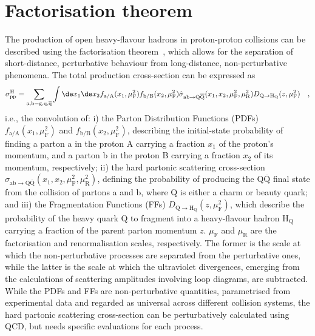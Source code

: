 \section{Factorisation theorem}
The production of open heavy-flavour hadrons in proton-proton collisions can be described using the factorisation theorem~\cite{Collins:1989gx}, which allows for the separation of short-distance, perturbative behaviour from long-distance, non-perturbative phenomena. The total production cross-section can be expressed as
\begin{equation}\label{eq:pp_xsec}
    \sigma_{\text{pp}}^\mathrm{H} = \sum_\mathrm{a,b = g, q, \overline{q}} \int \de x_1 \de x_2 f_\mathrm{a/A}(x_1,\mu_\mathrm{F}^2) f_\mathrm{b/B}(x_2,\mu_\mathrm{F}^2) \hat{\sigma}_\mathrm{ab \rightarrow Q\overline{Q}} (x_1,x_2,\mu_\mathrm{F}^2,\mu_\mathrm{R}^2) D_\mathrm{Q\rightarrow H_Q}(z,\mu_\mathrm{F}^2) \quad ,
\end{equation}
i.e., the convolution of: i) the Parton Distribution Functions (PDFs) $f_\mathrm{a/A}(x_1,\mu_\mathrm{F}^2)$ and $f_\mathrm{b/B}(x_2,\mu_\mathrm{F}^2)$, describing the initial-state probability of finding a parton a in the proton A carrying a fraction $x_1$ of the proton's momentum, and a parton b in the proton B carrying a fraction $x_2$ of its momentum, respectively; ii) the hard partonic scattering cross-section $\hat{\sigma}_\mathrm{ab \rightarrow Q\overline{Q}} (x_1,x_2,\mu_\mathrm{F}^2,\mu_\mathrm{R}^2)$, defining the probability of producing the $\mathrm{Q\overline{Q}}$ final state from the collision of partons a and b, where Q is either a charm or beauty quark; and iii) the Fragmentation Functions (FFs) $D_\mathrm{Q\rightarrow H_Q}(z,\mu_\mathrm{F}^2)$, which describe the probability of the heavy quark Q to fragment into a heavy-flavour hadron $\mathrm{H_Q}$ carrying a fraction of the parent parton momentum $z$. $\mu_\mathrm{F}$ and $\mu_\mathrm{R}$ are the factorisation and renormalisation scales, respectively. The former is the scale at which the non-perturbative processes are separated from the perturbative ones, while the latter is the scale at which the ultraviolet divergences, emerging from the calculations of scattering amplitudes involving loop diagrams, are subtracted. While the PDFs and FFs are non-perturbative quantities, parametrised from experimental data and regarded as universal across different collision systems, the hard partonic scattering cross-section can be perturbatively calculated using QCD, but needs specific evaluations for each process. 

